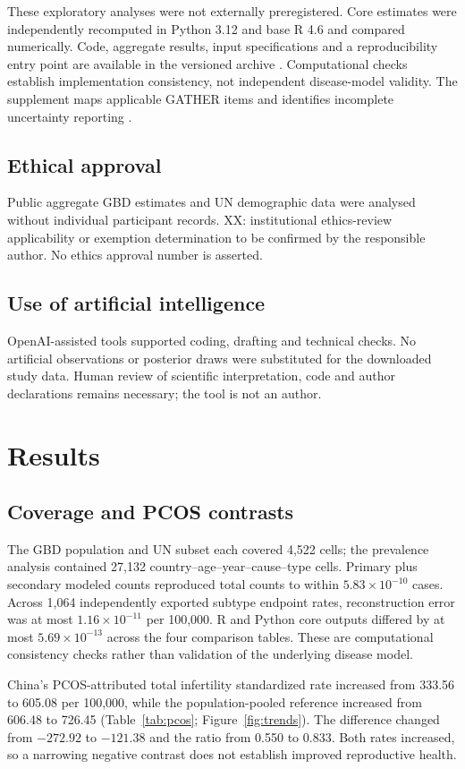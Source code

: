 \documentclass[11pt,a4paper]{article}
\begin{document}
These exploratory analyses were not externally preregistered. Core estimates were independently recomputed in Python 3.12 and base R 4.6 and compared numerically. Code, aggregate results, input specifications and a reproducibility entry point are available in the versioned archive \citep{repository}. Computational checks establish implementation consistency, not independent disease-model validity. The supplement maps applicable GATHER items and identifies incomplete uncertainty reporting \citep{gather}.

\subsection{Ethical approval}
Public aggregate GBD estimates and UN demographic data were analysed without individual participant records. XX: institutional ethics-review applicability or exemption determination to be confirmed by the responsible author. No ethics approval number is asserted.

\subsection{Use of artificial intelligence}
OpenAI-assisted tools supported coding, drafting and technical checks. No artificial observations or posterior draws were substituted for the downloaded study data. Human review of scientific interpretation, code and author declarations remains necessary; the tool is not an author.

\section{Results}
\subsection{Coverage and PCOS contrasts}
The GBD population and UN subset each covered 4,522 cells; the prevalence analysis contained 27,132 country--age--year--cause--type cells. Primary plus secondary modeled counts reproduced total counts to within $5.83\times10^{-10}$ cases. Across 1,064 independently exported subtype endpoint rates, reconstruction error was at most $1.16\times10^{-11}$ per 100,000. R and Python core outputs differed by at most $5.69\times10^{-13}$ across the four comparison tables. These are computational consistency checks rather than validation of the underlying disease model.

China's PCOS-attributed total infertility standardized rate increased from 333.56 to 605.08 per 100,000, while the population-pooled reference increased from 606.48 to 726.45 (Table~\ref{tab:pcos}; Figure~\ref{fig:trends}). The difference changed from $-272.92$ to $-121.38$ and the ratio from 0.550 to 0.833. Both rates increased, so a narrowing negative contrast does not establish improved reproductive health.
\end{document}
